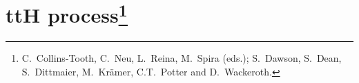 \section{ttH process\footnote{C.~Collins-Tooth, C.~Neu, L.~Reina,
M.~Spira (eds.); S.~Dawson, S.~Dean, S.~Dittmaier, M.~Kr\"amer,
C.T.~Potter and D.~Wackeroth.}}




%


